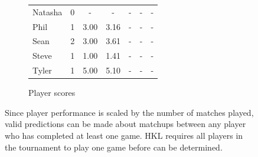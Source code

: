 \documentclass[letterpaper, 10 pt, conference]{ieeeconf}  %
\begin{document}
\begin{figure}[h!b]
\begin{subfigure}[hb]{0.4\textwidth}
\begin{tabular}{lccc|ccc}
                        Natasha	& 0	& -  	& -    & - & - & - \\
                        Phil	& 1	& 3.00	& 3.16 & - & - & - \\
                        Sean	& 2	& 3.00	& 3.61 & - & - & - \\
                        Steve	& 1	& 1.00 	& 1.41 & - & - & - \\
                        Tyler	& 1	& 5.00  & 5.10 & - & - & - \\
                        \bottomrule
                \end{tabular}
                \caption{Player scores}
        \end{subfigure}
        \caption{Since player performance is scaled by the number of matches
                 played, valid predictions can be made about matchups between
                 any player who has completed at least one game. HKL requires
                 all players in the tournament to play one game before can be
                 determined.}
\end{figure}
\end{document}
